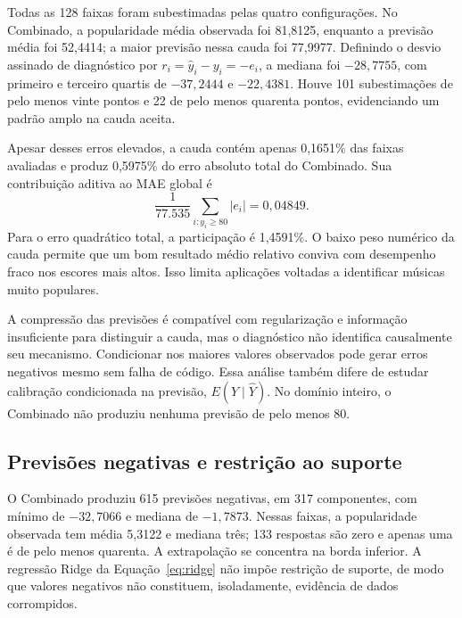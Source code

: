 
Todas as 128 faixas foram subestimadas pelas quatro configurações. No Combinado, a popularidade média observada foi 81,8125, enquanto a previsão média foi 52,4414; a maior previsão nessa cauda foi 77,9977. Definindo o desvio assinado de diagnóstico por $r_i=\widehat y_i-y_i=-e_i$, a mediana foi $-28,7755$, com primeiro e terceiro quartis de $-37,2444$ e $-22,4381$. Houve 101 subestimações de pelo menos vinte pontos e 22 de pelo menos quarenta pontos, evidenciando um padrão amplo na cauda aceita.

Apesar desses erros elevados, a cauda contém apenas 0,1651\% das faixas avaliadas e produz 0,5975\% do erro absoluto total do Combinado. Sua contribuição aditiva ao MAE global é
\begin{equation}\label{eq:contribuicaocauda}
 \frac{1}{77.535}\sum_{i:y_i\ge80}|e_i|=0,04849.
\end{equation}
Para o erro quadrático total, a participação é 1,4591\%. O baixo peso numérico da cauda permite que um bom resultado médio relativo conviva com desempenho fraco nos escores mais altos. Isso limita aplicações voltadas a identificar músicas muito populares.

A compressão das previsões é compatível com regularização e informação insuficiente para distinguir a cauda, mas o diagnóstico não identifica causalmente seu mecanismo. Condicionar nos maiores valores observados pode gerar erros negativos mesmo sem falha de código. Essa análise também difere de estudar calibração condicionada na previsão, $E(Y\mid\widehat Y)$. No domínio inteiro, o Combinado não produziu nenhuma previsão de pelo menos 80.

\FloatBarrier
\subsection{Previsões negativas e restrição ao suporte}
O Combinado produziu 615 previsões negativas, em 317 componentes, com mínimo de $-32,7066$ e mediana de $-1,7873$. Nessas faixas, a popularidade observada tem média 5,3122 e mediana três; 133 respostas são zero e apenas uma é de pelo menos quarenta. A extrapolação se concentra na borda inferior. A regressão Ridge da Equação~\ref{eq:ridge} não impõe restrição de suporte, de modo que valores negativos não constituem, isoladamente, evidência de dados corrompidos.

